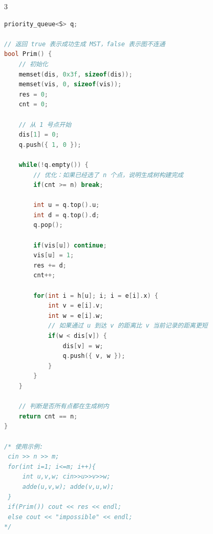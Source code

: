 \documentclass[10pt,landscape,a4paper]{article}
\begin{document}
\begin{multicols*}{3}
\begin{lstlisting}[language=C++]
priority_queue<S> q;

// 返回 true 表示成功生成 MST，false 表示图不连通
bool Prim() {
    // 初始化
    memset(dis, 0x3f, sizeof(dis));
    memset(vis, 0, sizeof(vis));
    res = 0;
    cnt = 0;

    // 从 1 号点开始
    dis[1] = 0;
    q.push({ 1, 0 });

    while(!q.empty()) {
        // 优化：如果已经选了 n 个点，说明生成树构建完成
        if(cnt >= n) break;

        int u = q.top().u;
        int d = q.top().d;
        q.pop();

        if(vis[u]) continue;
        vis[u] = 1;
        res += d;
        cnt++;

        for(int i = h[u]; i; i = e[i].x) {
            int v = e[i].v;
            int w = e[i].w;
            // 如果通过 u 到达 v 的距离比 v 当前记录的距离更短
            if(w < dis[v]) {
                dis[v] = w;
                q.push({ v, w });
            }
        }
    }

    // 判断是否所有点都在生成树内
    return cnt == n;
}

/* 使用示例:
 cin >> n >> m;
 for(int i=1; i<=m; i++){
     int u,v,w; cin>>u>>v>>w;
     adde(u,v,w); adde(v,u,w);
 }
 if(Prim()) cout << res << endl;
 else cout << "impossible" << endl;
*/
\end{lstlisting}

\end{multicols*}
\end{document}
